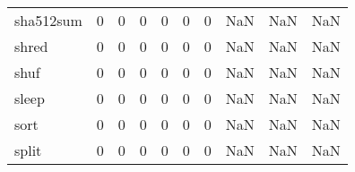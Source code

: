 \begin{longtable}{lrrrrrrrrr}
sha512sum &                                       0 &                                                  0 &                                                  0 &                                                  0 &                                                  0 &                                                  0 &                                                NaN &                                    NaN &                                  NaN \\
shred     &                                       0 &                                                  0 &                                                  0 &                                                  0 &                                                  0 &                                                  0 &                                                NaN &                                    NaN &                                  NaN \\
shuf      &                                       0 &                                                  0 &                                                  0 &                                                  0 &                                                  0 &                                                  0 &                                                NaN &                                    NaN &                                  NaN \\
sleep     &                                       0 &                                                  0 &                                                  0 &                                                  0 &                                                  0 &                                                  0 &                                                NaN &                                    NaN &                                  NaN \\
sort      &                                       0 &                                                  0 &                                                  0 &                                                  0 &                                                  0 &                                                  0 &                                                NaN &                                    NaN &                                  NaN \\
split     &                                       0 &                                                  0 &                                                  0 &                                                  0 &                                                  0 &                                                  0 &                                                NaN &                                    NaN &                                  NaN \\

\end{longtable}
